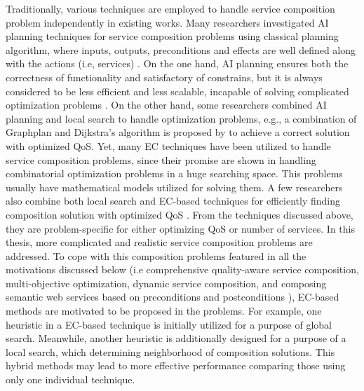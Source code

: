 Traditionally, various techniques are employed to handle service composition problem independently in existing works. Many researchers investigated AI planning techniques for service composition problems using classical planning algorithm, where inputs, outputs, preconditions and effects are well defined along with the actions (i.e, services) \cite{markou2015non,peer2005web}. On the one hand, AI planning ensures both the correctness of functionality and satisfactory of constrains, but it is always considered to be less efficient and less scalable, incapable of solving complicated optimization problems \cite{parejo2008qos}. On the other hand, some researchers combined AI planning and local search to handle optimization problems, e.g., a combination of Graphplan \cite{blum1997fast} and Dijkstra’s algorithm is proposed by \cite{feng2013dynamic} to achieve a correct solution with optimized QoS. Yet, many EC techniques have been utilized to handle service composition problems, since their promise are shown in handling combinatorial optimization problems in a huge searching space. This problems usually have mathematical models utilized for solving them. A few researchers also combine both local search and EC-based techniques for efficiently finding composition solution with optimized QoS \cite{parejo2008qos}. From the techniques discussed above, they are problem-specific for either optimizing QoS or number of services. In this thesis, more complicated and realistic service composition problems are addressed. To cope with this composition problems featured in all the motivations discussed below (i.e comprehensive quality-aware service composition, multi-objective optimization, dynamic service composition, and composing semantic web services based on preconditions and postconditions ), EC-based methods are motivated to be proposed in the problems. For example, one heuristic in a EC-based technique is initially utilized for a purpose of global search. Meanwhile, another heuristic is additionally designed for a purpose of a local search, which determining neighborhood of composition solutions. This hybrid methods may lead to more effective performance comparing those using only one individual technique.

